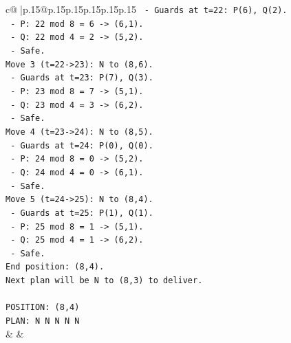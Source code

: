 \documentclass{article}
\begin{document}
{\begin{supertabular}{c@{$\;$}|p{.15\linewidth}@{}p{.15\linewidth}p{.15\linewidth}p{.15\linewidth}p{.15\linewidth}p{.15\linewidth}}
{{{\texttt{  {-} Guards at t=22: P(6), Q(2).} \\
\texttt{    {-} P: 22 mod 8 = 6 {-}> (6,1).} \\
\texttt{    {-} Q: 22 mod 4 = 2 {-}> (5,2).} \\
\texttt{  {-} Safe.} \\
\texttt{Move 3 (t=22{-}>23): N to (8,6).} \\
\texttt{  {-} Guards at t=23: P(7), Q(3).} \\
\texttt{    {-} P: 23 mod 8 = 7 {-}> (5,1).} \\
\texttt{    {-} Q: 23 mod 4 = 3 {-}> (6,2).} \\
\texttt{  {-} Safe.} \\
\texttt{Move 4 (t=23{-}>24): N to (8,5).} \\
\texttt{  {-} Guards at t=24: P(0), Q(0).} \\
\texttt{    {-} P: 24 mod 8 = 0 {-}> (5,2).} \\
\texttt{    {-} Q: 24 mod 4 = 0 {-}> (6,1).} \\
\texttt{  {-} Safe.} \\
\texttt{Move 5 (t=24{-}>25): N to (8,4).} \\
\texttt{  {-} Guards at t=25: P(1), Q(1).} \\
\texttt{    {-} P: 25 mod 8 = 1 {-}> (5,1).} \\
\texttt{    {-} Q: 25 mod 4 = 1 {-}> (6,2).} \\
\texttt{  {-} Safe.} \\
\texttt{End position: (8,4).} \\
\texttt{Next plan will be N to (8,3) to deliver.} \\
\\ 
\texttt{POSITION: (8,4)} \\
\texttt{PLAN: N N N N N} \\
            }
        }
    }
    & & \\ \\


\end{supertabular}}
\end{document}
